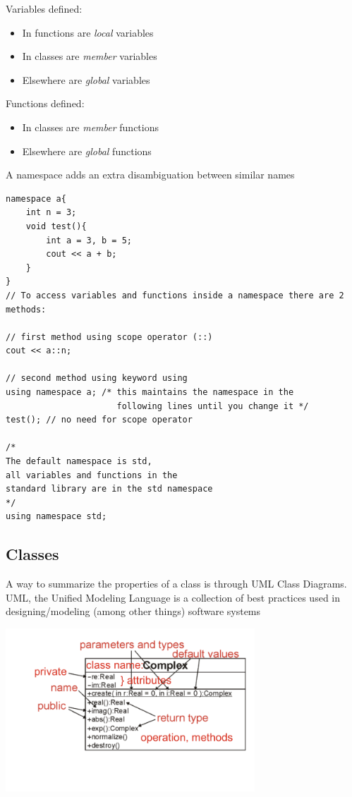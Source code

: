 \documentclass[11pt]{article}
\theoremstyle{definition}
\begin{document}
Variables defined:
\vspace{-4mm}
\begin{itemize}[label={--},topsep=0pt]
    \item In functions are \textit{local} variables
    \item In classes are \textit{member} variables
    \item Elsewhere are \textit{global} variables
\end{itemize}
Functions defined:
\vspace{-4mm}
\begin{itemize}[label={--},topsep=0pt]
    \item In classes are \textit{member} functions
    \item Elsewhere are \textit{global} functions
\end{itemize}
A namespace adds an extra disambiguation between similar names
\begin{lstlisting}
namespace a{
    int n = 3;
    void test(){
        int a = 3, b = 5;
        cout << a + b;
    }
}
// To access variables and functions inside a namespace there are 2 methods:

// first method using scope operator (::)
cout << a::n;

// second method using keyword using
using namespace a; /* this maintains the namespace in the 
                      following lines until you change it */
test(); // no need for scope operator

/* 
The default namespace is std, 
all variables and functions in the 
standard library are in the std namespace 
*/
using namespace std; 
\end{lstlisting}
\newpage
\subsection{Classes}

\begin{minipage}{0.3\textwidth}
A way to summarize the properties of a class is through UML Class Diagrams.
\\
UML, the Unified Modeling Language is a collection of best practices used in designing/modeling (among other things) software systems
\end{minipage}%
%
\begin{minipage}{0.7\textwidth}
\begin{center}
    \includegraphics[width=0.7\textwidth]{uml2}
    \label{img:g}
\end{center}
\end{minipage}
\end{document}
